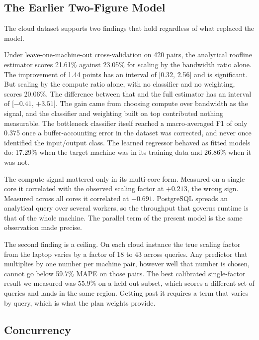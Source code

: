 \documentclass[runningheads]{llncs}
\begin{document}
\subsection{The Earlier Two-Figure Model}
\label{sec:legacy}

The cloud dataset supports two findings that hold regardless of what replaced
the model.

Under leave-one-machine-out cross-validation on 420 pairs, the analytical
roofline estimator scores 21.61\% against 23.05\% for scaling by the
bandwidth ratio alone. The improvement of 1.44 points has an interval of
[0.32, 2.56] and is significant. But scaling by the compute ratio alone, with
no classifier and no weighting, scores 20.06\%. The difference between that
and the full estimator has an interval of [$-0.41$, $+3.51$]. The gain came
from choosing compute over bandwidth as the signal, and the classifier and
weighting built on top contributed nothing measurable. The bottleneck
classifier itself reached a macro-averaged F1 of only 0.375 once a
buffer-accounting error in the dataset was corrected, and never once
identified the input/output class. The learned regressor behaved as fitted
models do: 17.29\% when the target machine was in its training data and
26.86\% when it was not.

The compute signal mattered only in its multi-core form. Measured on a single
core it correlated with the observed scaling factor at $+0.213$, the wrong
sign. Measured across all cores it correlated at $-0.691$. PostgreSQL spreads
an analytical query over several workers, so the throughput that governs
runtime is that of the whole machine. The parallel term of the present model
is the same observation made precise.

The second finding is a ceiling. On each cloud instance the true scaling
factor from the laptop varies by a factor of 18 to 43 across queries. Any
predictor that multiplies by one number per machine pair, however well that
number is chosen, cannot go below 59.7\% MAPE on those pairs. The best
calibrated single-factor result we measured was 55.9\% on a held-out subset,
which scores a different set of queries and lands in the same region. Getting past it requires a term that
varies by query, which is what the plan weights provide.

\subsection{Concurrency}
\label{sec:concurrency}
\end{document}

